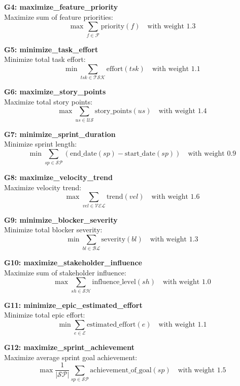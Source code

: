 \documentclass[12pt]{article}
\begin{document}
    \item \textbf{G4: maximize\_feature\_priority} \\
    Maximize sum of feature priorities:
    \[
    \max \sum_{f \in \mathcal{F}} \text{priority}(f) \quad \text{with weight } 1.3
    \]

    \item \textbf{G5: minimize\_task\_effort} \\
    Minimize total task effort:
    \[
    \min \sum_{tsk \in \mathcal{TSK}} \text{effort}(tsk) \quad \text{with weight } 1.1
    \]

    \item \textbf{G6: maximize\_story\_points} \\
    Maximize total story points:
    \[
    \max \sum_{us \in \mathcal{US}} \text{story\_points}(us) \quad \text{with weight } 1.4
    \]

    \item \textbf{G7: minimize\_sprint\_duration} \\
    Minimize sprint length:
    \[
    \min \sum_{sp \in \mathcal{SP}} \left( \text{end\_date}(sp) - \text{start\_date}(sp) \right) \quad \text{with weight } 0.9
    \]

    \item \textbf{G8: maximize\_velocity\_trend} \\
    Maximize velocity trend:
    \[
    \max \sum_{vel \in \mathcal{VEL}} \text{trend}(vel) \quad \text{with weight } 1.6
    \]

    \item \textbf{G9: minimize\_blocker\_severity} \\
    Minimize total blocker severity:
    \[
    \min \sum_{bl \in \mathcal{BL}} \text{severity}(bl) \quad \text{with weight } 1.3
    \]

    \item \textbf{G10: maximize\_stakeholder\_influence} \\
    Maximize sum of stakeholder influence:
    \[
    \max \sum_{sh \in \mathcal{SH}} \text{influence\_level}(sh) \quad \text{with weight } 1.0
    \]

    \item \textbf{G11: minimize\_epic\_estimated\_effort} \\
    Minimize total epic effort:
    \[
    \min \sum_{e \in \mathcal{E}} \text{estimated\_effort}(e) \quad \text{with weight } 1.1
    \]

    \item \textbf{G12: maximize\_sprint\_achievement} \\
    Maximize average sprint goal achievement:
    \[
    \max \frac{1}{|\mathcal{SP}|} \sum_{sp \in \mathcal{SP}} \text{achievement\_of\_goal}(sp) \quad \text{with weight } 1.5
    \]
\end{document}
